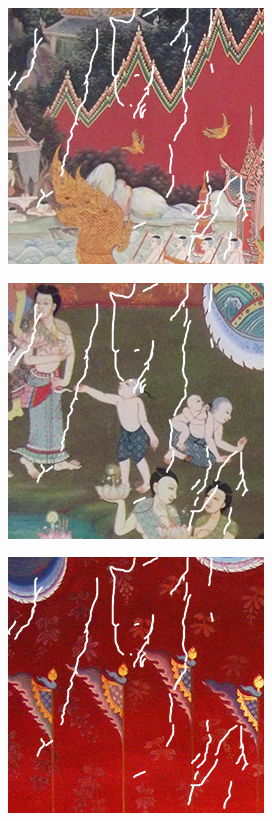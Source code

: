 \begin{figure}[H]
	\centering
	\begin{subfigure}{\ResultSubFigureWidth \linewidth}
		\centering
		\includegraphics[width=\ResultSubFigurePadding \linewidth]{image/thaiart/case01-toinpaint.png}
	\end{subfigure}
	\begin{subfigure}{\ResultSubFigureWidth \linewidth}
		\centering
		\includegraphics[width=\ResultSubFigurePadding \linewidth]{image/thaiart/case02-toinpaint.png}
	\end{subfigure}
	\vspace{1cm}
	\begin{subfigure}{\ResultSubFigureWidth \linewidth}
		\centering
		\includegraphics[width=\ResultSubFigurePadding \linewidth]{image/thaiart/case03-toinpaint.png}			

\end{subfigure}
\end{figure}
